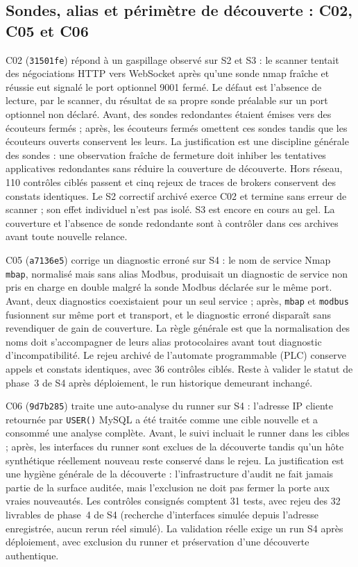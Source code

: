 \documentclass[11pt,a4paper]{article}
\newcommand{\code}[1]{{\urlstyle{tt}\nolinkurl{#1}}}
\begin{document}
\subsection{Sondes, alias et périmètre de découverte : C02, C05 et C06}
\label{sec:sondes}

C02 (\code{31501fe}) répond à un gaspillage observé sur S2 et S3 : le scanner tentait des négociations HTTP vers WebSocket après qu'une sonde nmap fraîche et réussie eut signalé le port optionnel 9001 fermé. Le défaut est l'absence de lecture, par le scanner, du résultat de sa propre sonde préalable sur un port optionnel non déclaré. Avant, des sondes redondantes étaient émises vers des écouteurs fermés ; après, les écouteurs fermés omettent ces sondes tandis que les écouteurs ouverts conservent les leurs. La justification est une discipline générale des sondes : une observation fraîche de fermeture doit inhiber les tentatives applicatives redondantes sans réduire la couverture de découverte. Hors réseau, 110 contrôles ciblés passent et cinq rejeux de traces de brokers conservent des constats identiques. Le S2 correctif archivé exerce C02 et termine sans erreur de scanner ; son effet individuel n’est pas isolé. S3 est encore en cours au gel. La couverture et l’absence de sonde redondante sont à contrôler dans ces archives avant toute nouvelle relance.

C05 (\code{a7136e5}) corrige un diagnostic erroné sur S4 : le nom de service Nmap \code{mbap}, normalisé mais sans alias Modbus, produisait un diagnostic de service non pris en charge en double malgré la sonde Modbus déclarée sur le même port. Avant, deux diagnostics coexistaient pour un seul service ; après, \code{mbap} et \code{modbus} fusionnent sur même port et transport, et le diagnostic erroné disparaît sans revendiquer de gain de couverture. La règle générale est que la normalisation des noms doit s'accompagner de leurs alias protocolaires avant tout diagnostic d'incompatibilité. Le rejeu archivé de l'automate programmable (PLC) conserve appels et constats identiques, avec 36 contrôles ciblés. Reste à valider le statut de phase~3 de S4 après déploiement, le run historique demeurant inchangé.

C06 (\code{9d7b285}) traite une auto-analyse du runner sur S4 : l'adresse IP cliente retournée par \code{USER()} MySQL a été traitée comme une cible nouvelle et a consommé une analyse complète. Avant, le suivi incluait le runner dans les cibles ; après, les interfaces du runner sont exclues de la découverte tandis qu'un hôte synthétique réellement nouveau reste conservé dans le rejeu. La justification est une hygiène générale de la découverte : l'infrastructure d'audit ne fait jamais partie de la surface auditée, mais l'exclusion ne doit pas fermer la porte aux vraies nouveautés. Les contrôles consignés comptent 31 tests, avec rejeu des 32 livrables de phase~4 de S4 (recherche d'interfaces simulée depuis l'adresse enregistrée, aucun rerun réel simulé). La validation réelle exige un run S4 après déploiement, avec exclusion du runner et préservation d'une découverte authentique.
\end{document}
